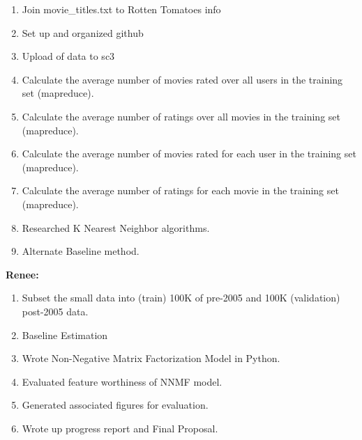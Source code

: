 \documentclass[11pt]{article}
\begin{document}
\begin{enumerate}
\item Join movie\_titles.txt to Rotten Tomatoes info 
\item Set up and organized github
\item Upload of data to sc3
\item Calculate the average number of movies rated over all users in the training set (mapreduce).
\item Calculate the average number of ratings over all movies in the training set (mapreduce).
\item  Calculate the average number of movies rated for each user in the training set (mapreduce).
\item  Calculate the average number of ratings for each movie in the training set (mapreduce).
\item Researched K Nearest Neighbor algorithms.
\item Alternate Baseline method.
\end{enumerate}

{\bf Renee:}

\begin{enumerate}
\item Subset the small data into (train) 100K of pre-2005 and 100K (validation) post-2005 data. 
\item Baseline Estimation
\item Wrote Non-Negative Matrix Factorization Model in Python.
\item Evaluated feature worthiness of NNMF model.
\item Generated associated figures for evaluation.
\item Wrote up progress report and Final Proposal. 
\end{enumerate}
\end{document}
